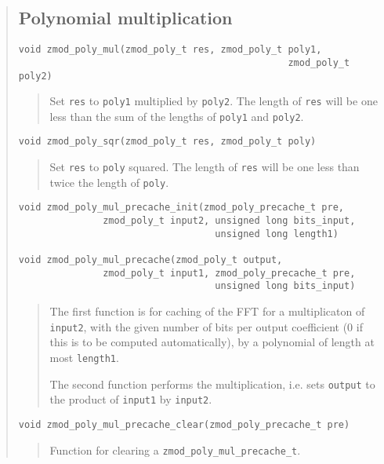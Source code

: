 \documentclass[a4paper,10pt]{article}
\newcommand{\code}{\lstinline}
\begin{document}
\begin{quote}
\subsection{Polynomial multiplication}
\begin{lstlisting}
void zmod_poly_mul(zmod_poly_t res, zmod_poly_t poly1, 
                                                zmod_poly_t poly2)
\end{lstlisting}
\begin{quote}
Set \code{res} to \code{poly1} multiplied by \code{poly2}. The length of \code{res} will be one less than the sum of the lengths of \code{poly1} and \code{poly2}.
\end{quote}

\begin{lstlisting}
void zmod_poly_sqr(zmod_poly_t res, zmod_poly_t poly)
\end{lstlisting}
\begin{quote}
Set \code{res} to \code{poly} squared. The length of \code{res} will be one less than twice the length of \code{poly}. 
\end{quote}

\begin{lstlisting}
void zmod_poly_mul_precache_init(zmod_poly_precache_t pre,
               zmod_poly_t input2, unsigned long bits_input,
                                   unsigned long length1)

void zmod_poly_mul_precache(zmod_poly_t output,
               zmod_poly_t input1, zmod_poly_precache_t pre,
                                   unsigned long bits_input)
\end{lstlisting}
\begin{quote}
The first function is for caching of the FFT for a multiplicaton of \code{input2}, with the given number of bits per output coefficient (0 if this is to be computed automatically), by a polynomial of length at most \code{length1}.  

The second function performs the multiplication, i.e. sets \code{output} to the product of \code{input1} by \code{input2}. 
\end{quote}

\begin{lstlisting}
void zmod_poly_mul_precache_clear(zmod_poly_precache_t pre)
\end{lstlisting}
\begin{quote}
Function for clearing a \code{zmod_poly_mul_precache_t}.
\end{quote}


\end{quote}
\end{document}
